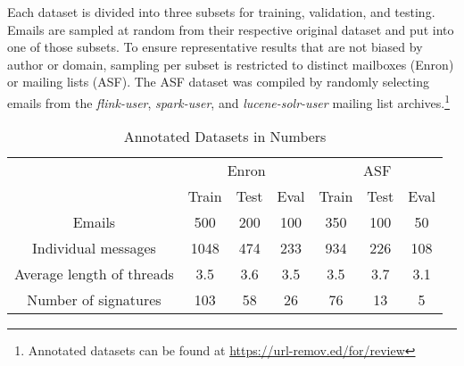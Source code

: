 \documentclass{llncs}
\begin{document}
Each dataset is divided into three subsets for training, validation, and testing.
Emails are sampled at random from their respective original dataset and put into one of those subsets.
To ensure representative results that are not biased by author or domain, sampling per subset is restricted to distinct mailboxes (Enron) or mailing lists (ASF).
The ASF dataset was compiled by randomly selecting emails from the \textit{flink-user}, \textit{spark-user}, and \textit{lucene-solr-user} mailing list archives.\footnote{Annotated datasets can be found at \url{https://url-remov.ed/for/review}}


\begin{table}[tb]
	\caption{Annotated Datasets in Numbers}
	\label{tab:dataset}
	\centering
	\begin{tabular*}{\textwidth}{@{\extracolsep{\fill}} ccccccc}
		\toprule
		& \multicolumn{3}{c}{Enron} &  \multicolumn{3}{c}{ASF} \\
		\cmidrule{2-4}
		\cmidrule{5-7}
		                          & Train    & Test   & Eval   & Train   & Test   & Eval  \\
		\midrule
		Emails                    & 500      & 200    & 100    &  350   &  100   &   50   \\
		Individual messages       & 1048     & 474    & 233    &  934   &  226   &   108  \\
		Average length of threads & 3.5      & 3.6    & 3.5    &  3.5   &  3.7   &   3.1  \\
		Number of signatures      & 103      & 58     & 26     &  76    &  13    &   5    \\
		\bottomrule
	\end{tabular*}
\end{table}
\end{document}
